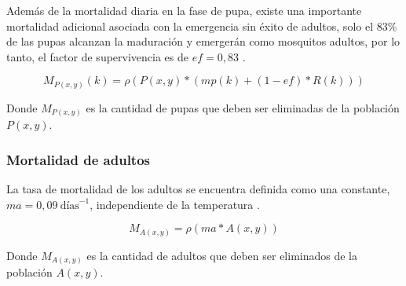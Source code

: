 Además de la mortalidad diaria en la fase de pupa, existe una importante mortalidad adicional
asociada con la emergencia sin éxito de adultos, solo el 83\%  de las pupas alcanzan la maduración
y emergerán como mosquitos adultos, por lo tanto, el factor de supervivencia es de $ef=0,83$
\cite{otero2006stochastic}.

\begin{equation}
    M_{P(x,y)}(k) = \rho(P(x,y) * (mp(k) + (1 - ef) * R(k)))
\end{equation}

Donde $M_{P(x,y)}$ es la cantidad de pupas que deben ser eliminadas de la población $P(x,y)$.

\subsubsection{Mortalidad de adultos}
La tasa de mortalidad de los adultos se encuentra definida como una constante,
$ma = 0,09\ \text{días}^{-1}$, independiente de la temperatura \cite{otero2006stochastic}.

\begin{equation}
    M_{A(x,y)} = \rho(ma * A(x,y))
\end{equation}

Donde $M_{A(x,y)}$ es la cantidad de adultos que deben ser eliminados de la población $A(x,y)$.
